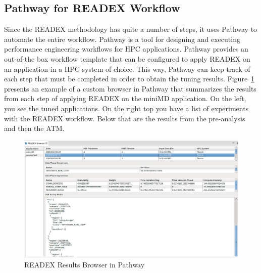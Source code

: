 \subsection{Pathway for READEX Workflow}
\label{sec:pathway_for_readex_workflow}

Since the READEX methodology has quite a number of steps, it uses Pathway to automate the entire workflow. Pathway \cite{Pathway:Petkov13} is a tool for designing and executing performance engineering workflows for HPC applications. Pathway provides an out-of-the box workflow template that can be configured to apply READEX on an application in a HPC system of choice. This way, Pathway can keep track of each step that must be completed in order to obtain the tuning results. Figure~\ref{fig:pathway_browser} presents an example of a custom browser in Pathway that summarizes the results from each step of applying READEX on the miniMD application. On the left, you see the tuned applications. On the right top you have a list of experiments with the READEX workflow. Below that are the results from the pre-analysis and then the ATM.


\begin{figure}[!t]
\centering
\includegraphics[width=.95\columnwidth]{figures/PathwayBrowser.jpeg}
\caption{READEX Results Browser in Pathway}
\label{fig:pathway_browser}
\end{figure}
